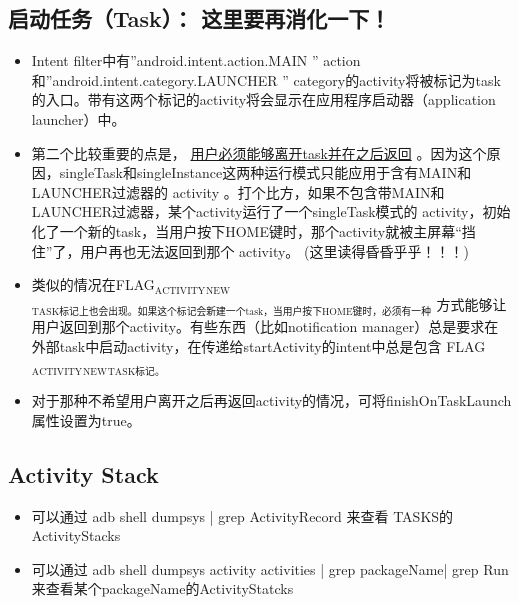 \documentclass[9pt, b5paaper]{book}
\begin{document}
\subsection{启动任务（Task）： 这里要再消化一下！}
\label{sec-4-7-2}
\begin{itemize}
\item Intent filter中有”android.intent.action.MAIN ” action和”android.intent.category.LAUNCHER ” category的activity将被标记为task的入口。带有这两个标记的activity将会显示在应用程序启动器（application launcher）中。
\item 第二个比较重要的点是， \uline{用户必须能够离开task并在之后返回} 。因为这个原因，singleTask和singleInstance这两种运行模式只能应用于含有MAIN和LAUNCHER过滤器的 activity 。打个比方，如果不包含带MAIN和LAUNCHER过滤器，某个activity运行了一个singleTask模式的 activity，初始化了一个新的task，当用户按下HOME键时，那个activity就被主屏幕“挡住”了，用户再也无法返回到那个 activity。 (这里读得昏昏乎乎！！！)
\item 类似的情况在FLAG$_{\text{ACTIVITY}}$$_{\text{NEW}}$$_{\text{TASK标记上也会出现。如果这个标记会新建一个task，当用户按下HOME键时，必须有一种}}$ 方式能够让用户返回到那个activity。有些东西（比如notification manager）总是要求在外部task中启动activity，在传递给startActivity的intent中总是包含 FLAG$_{\text{ACTIVITY}}$$_{\text{NEW}}$$_{\text{TASK标记。}}$
\item 对于那种不希望用户离开之后再返回activity的情况，可将finishOnTaskLaunch属性设置为true。
\end{itemize}
\subsection{Activity Stack}
\label{sec-4-7-3}
\begin{itemize}
\item 可以通过 adb shell dumpsys | grep ActivityRecord 来查看 TASKS的ActivityStacks
\item 可以通过 adb shell dumpsys activity activities | grep packageName| grep Run 来查看某个packageName的ActivityStatcks
\end{itemize}
\end{document}
